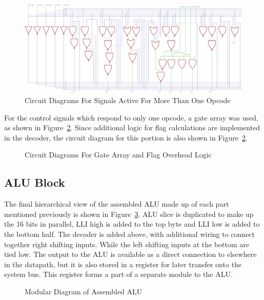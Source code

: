 \begin{figure}[h]
	\centering
	\includegraphics[width=\textwidth]{Figures/ALUDecoderMore1.png}
	\caption{Circuit Diagrams For Signals Active For More Than One Opcode}
	\label{fig:DecMultiCirs}
\end{figure}

For the control signals which respond to only one opcode, a gate array was used, as shown in Figure~\ref{fig:GateArray}. 
Since additional logic for flag calculations are implemented in the decoder, the circuit diagram for this portion is also shown in Figure~\ref{fig:GateArray}. 

\begin{figure}[h]
	\caption{Circuit Diagrams For Gate Array and Flag Overhead Logic}
	\label{fig:GateArray}
\end{figure}

\subsection{ALU Block}
The final hierarchical view of the assembled ALU made up of each part mentioned previously is shown in Figure~\ref{fig:ALUAssembled}. 
ALU slice is duplicated to make up the 16 bits in parallel, LLI high is added to the top byte and LLI low is added to the bottom half. 
The decoder is added above, with additional wiring to connect together right shifting inputs. 
While the left shifting inputs at the bottom are tied low. 
The output to the ALU is available as a direct connection to elsewhere in the datapath, but it is also stored in a register for later transfer onto the system bus. 
This register forms a part of a separate module to the ALU. 

\begin{figure}[h]
	\caption{Modular Diagram of Assembled ALU}
	\label{fig:ALUAssembled}
\end{figure}
